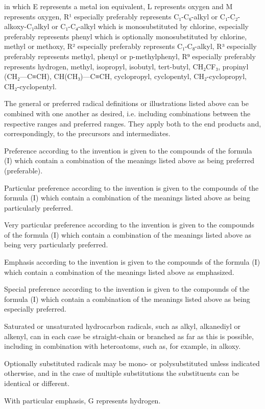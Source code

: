 \documentclass[11pt,a4paper]{article}
\begin{document}
in which E represents a metal ion equivalent, L represents oxygen and M represents oxygen, R¹ especially preferably represents C₁-C₆-alkyl or C₁-C₂-alkoxy-C₁alkyl or C₁-C₄-alkyl which is monosubstituted by chlorine, especially preferably represents phenyl which is optionally monosubstituted by chlorine, methyl or methoxy, R² especially preferably represents C₁-C₈-alkyl, R³ especially preferably represents methyl, phenyl or p-methylphenyl, R⁹ especially preferably represents hydrogen, methyl, isopropyl, isobutyl, tert-butyl, CH₂CF₃, propinyl (CH₂—C≡CH), CH(CH₃)—C≡CH, cyclopropyl, cyclopentyl, CH₂-cyclopropyl, CH₂-cyclopentyl.

The general or preferred radical definitions or illustrations listed above can be combined with one another as desired, i.e. including combinations between the respective ranges and preferred ranges. They apply both to the end products and, correspondingly, to the precursors and intermediates.

Preference according to the invention is given to the compounds of the formula (I) which contain a combination of the meanings listed above as being preferred (preferable).

Particular preference according to the invention is given to the compounds of the formula (I) which contain a combination of the meanings listed above as being particularly preferred.

Very particular preference according to the invention is given to the compounds of the formula (I) which contain a combination of the meanings listed above as being very particularly preferred.

Emphasis according to the invention is given to the compounds of the formula (I) which contain a combination of the meanings listed above as emphasized.

Special preference according to the invention is given to the compounds of the formula (I) which contain a combination of the meanings listed above as being especially preferred.

Saturated or unsaturated hydrocarbon radicals, such as alkyl, alkanediyl or alkenyl, can in each case be straight-chain or branched as far as this is possible, including in combination with heteroatoms, such as, for example, in alkoxy.

Optionally substituted radicals may be mono- or polysubstituted unless indicated otherwise, and in the case of multiple substitutions the substituents can be identical or different.

With particular emphasis, G represents hydrogen.
\end{document}
